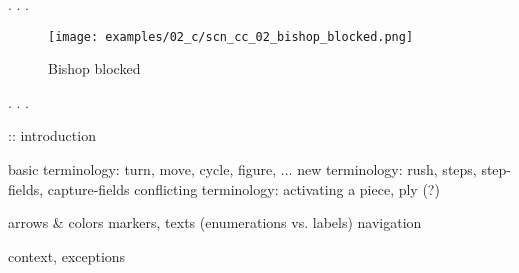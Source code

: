 . . .

\clearpage %

\vspace*{-2.1\baselineskip}
\noindent
\begin{figure}[!h]
\texttt{[image: examples/02\_c/scn\_cc\_02\_bishop\_blocked.png]}
\caption{Bishop blocked}
\label{fig:scn_cc_02_bishop_blocked}
\end{figure}

. . .

\clearpage %

\noindent
\TODO :: introduction \newline

\noindent
\textrightarrow basic terminology: turn, move, cycle, figure, ... \newline
\textrightarrow new terminology: rush, steps, step-fields, capture-fields \newline
\textrightarrow conflicting terminology: activating a piece, ply (?) \newline

\noindent
\textrightarrow arrows \& colors \newline
\textrightarrow markers, texts (enumerations vs. labels) \newline
\textrightarrow navigation \newline

\noindent
\textrightarrow context, exceptions \newline

\clearpage %

